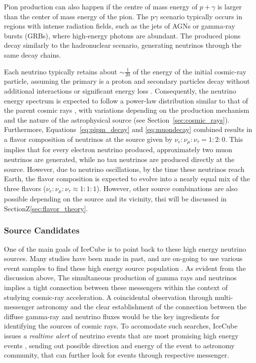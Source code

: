 Pion production can also happen if the centre of mass energy of $p+\gamma$ is larger than the center of mass energy of the pion. The p$\gamma$ scenario typically occurs in regions with intense radiation fields, such as the jets of AGNs or gamma-ray bursts (GRBs), where high-energy photons are abundant. The produced pions decay similarly to the hadronuclear scenario, generating neutrinos through the same decay chains. 

Each neutrino typically retains about \( \sim \frac{1}{20} \) of the energy of the initial cosmic-ray particle, assuming the primary is a proton and secondary particles decay without additional interactions or significant energy loss . Consequently, the neutrino energy spectrum is expected to follow a power-law distribution similar to that of the parent cosmic rays , with variations depending on the production mechanism and the nature of the astrophysical source (see Section~\ref{sec:cosmic_rays}). Furthermore, Equations~\ref{eq:pipm_decay} and \ref{eq:muondecay} combined results in a flavor composition of neutrinos at the source given by $\nu_e : \nu_\mu : \nu_\tau = 1 : 2 : 0$. This implies that for every electron neutrino produced, approximately two muon neutrinos are generated, while no tau neutrinos are produced directly at the source. However, due to neutrino oscillations, by the time these neutrinos reach Earth, the flavor composition is expected to evolve into a nearly equal mix of the three flavors ($\nu_e : \nu_\mu : \nu_\tau \approx 1 : 1 : 1$). However, other source combinations are also possible depending on the source and its vicinity, thsi will be discussed in SectionZ\ref{sec:flavor_theory}.

\subsubsection*{Source Candidates}
\label{sec:sources_astro_nu}
One of the main goals of IceCube is to point back to these high energy neutrino sources. Many studies have been made in past, and are on-going to use various event samples to find these high energy source population . As evident from the discussion above, The simultaneous production of gamma rays and neutrinos implies a tight connection between these messengers within the context of studying cosmic-ray acceleration. A coincidental observation through multi-messenger astronomy and the clear establishment of the connection between the diffuse gamma-ray and neutrino fluxes would be the key ingredients for identifying the sources of cosmic rays. To accomodate such searches, IceCube issues \emph{a realtime alert} of neutrino events that are most promising high energy events , sending out possible direction and energy of the event to astronomy community, that can further look for events through respective messenger.  

